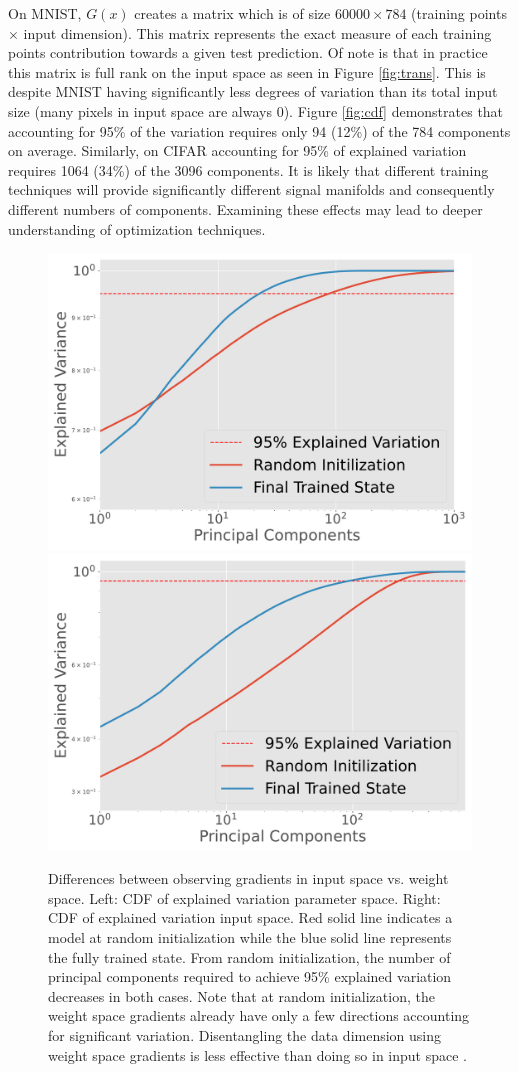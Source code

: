 On MNIST, $G(x)$ creates a matrix which is of size $60000 \times 784$ (training points $\times$ input dimension).
This matrix represents the exact measure of each training points contribution towards a given test prediction.
Of note is that in practice this matrix is full rank on the input space as seen in Figure \ref{fig:trans}.
This is despite MNIST having significantly less degrees of variation than its total input size (many pixels in input space are always 0).
Figure \ref{fig:cdf} demonstrates that accounting for 95\% of the variation requires only 94 (12\%) of the 784 components on average.
Similarly, on CIFAR accounting for 95\% of explained variation requires 1064 (34\%) of the 3096 components.
It is likely that different training techniques will provide significantly different signal manifolds and consequently different numbers of components.
Examining these effects may lead to deeper understanding of optimization techniques.

\begin{figure}[t]
    \centering
    \includegraphics[width=.45\textwidth]{c4a_figures/dimension_change_weightspace.pdf}
    \includegraphics[width=.45\textwidth]{c4a_figures/dimension_change.pdf}
    \caption{Differences between observing gradients in input space vs. weight space. Left: CDF of explained variation parameter space. Right: CDF of explained variation input space. Red solid line indicates a model at random initialization while the blue solid line represents the fully trained state. From random initialization, the number of principal components required to achieve 95\% explained variation decreases in both cases. Note that at random initialization, the weight space gradients already have only a few directions accounting for significant variation. Disentangling the data dimension using weight space gradients is less effective than doing so in input space \citep{shamir2021dimpled}.}
    \label{fig:compare}
\end{figure}

